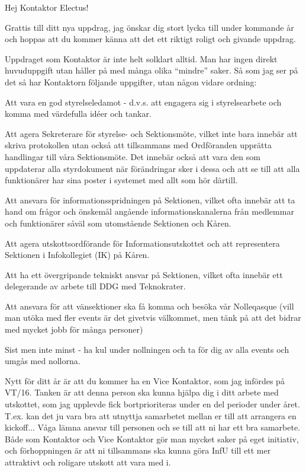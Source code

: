 \documentclass[10pt]{article}
\begin{document}
\heading{\doctitle}

Hej Kontaktor Electus!

Grattis till ditt nya uppdrag, jag önskar dig stort lycka till under kommande år och hoppas att du kommer känna att det ett riktigt roligt och givande uppdrag.

Uppdraget som Kontaktor är inte helt solklart alltid. Man har ingen direkt huvuduppgift utan håller på med många olika ``mindre'' saker. Så som jag ser på det så har Kontaktorn följande uppgifter, utan någon vidare ordning:
\begin{dashlist}
    \item Att vara en god styrelseledamot - d.v.s. att engagera sig i styrelsearbete och komma med värdefulla idéer och tankar.
    \item Att agera Sekreterare för styrelse- och Sektionsmöte, vilket inte bara innebär att skriva protokollen utan också att tillsammans med Ordföranden upprätta handlingar till våra Sektionsmöte. Det innebär också att vara den som uppdaterar alla styrdokument när förändringar sker i dessa och att se till att alla funktionärer har sina poster i systemet med allt som hör därtill.
    \item Att ansvara för informationsspridningen på Sektionen, vilket ofta innebär att ta hand om frågor och önskemål angående informationskanalerna från medlemmar och funktionärer såväl som utomstående Sektionen och Kåren.
    \item Att agera utskottsordförande för Informationsutskottet och att representera Sektionen i Infokollegiet (IK) på Kåren.
    \item Att ha ett övergripande tekniskt ansvar på Sektionen, vilket ofta innebär ett delegerande av arbete till DDG med Teknokrater.
    \item Att ansvara för att vänsektioner ska få komma och besöka vår Nolleqasque (vill man utöka med fler events är det givetvis välkommet, men tänk på att det bidrar med mycket jobb för många personer)
    \item Sist men inte minst - ha kul under nollningen och ta för dig av alla events och umgås med nollorna.
\end{dashlist}

Nytt för ditt år är att du kommer ha en Vice Kontaktor, som jag infördes på VT/16. Tanken är att denna person ska kunna hjälpa dig i ditt arbete med utskottet, som jag upplevde fick bortprioriteras under en del perioder under året. T.ex. kan det ju vara bra att utnyttja samarbetet mellan er till att arrangera en kickoff... Våga lämna ansvar till personen och se till att ni har ett bra samarbete. Både som Kontaktor och Vice Kontaktor gör man mycket saker på eget initiativ, och förhoppningen är att ni tillsammans ska kunna göra InfU till ett mer attraktivt och roligare utskott att vara med i.
\end{document}
